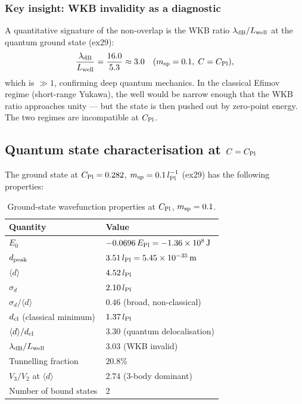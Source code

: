 \subsubsection{Key insight: WKB invalidity as a diagnostic}

A quantitative signature of the non-overlap is the WKB ratio
$\lambda_{\rm dB}/L_{\rm well}$ at the quantum ground state (ex29):
\begin{equation}
  \frac{\lambda_{\rm dB}}{L_{\rm well}} = \frac{16.0}{5.3} \approx 3.0
  \quad (m_{\rm sp}=0.1,\; C=C_{\rm Pl}),
\end{equation}
which is $\gg1$, confirming deep quantum mechanics.  In the classical Efimov
regime (short-range Yukawa), the well would be narrow enough that the
WKB ratio approaches unity — but the state is then pushed out by zero-point
energy.  The two regimes are incompatible at $C_{\rm Pl}$.

\subsection{Quantum state characterisation at
  \texorpdfstring{$C=C_{\rm Pl}$}{C=C\_Pl}}
\label{sec:wavefunction_summary}

The ground state at $C_{\rm Pl}=0.282$, $m_{\rm sp}=0.1\,l_{\rm Pl}^{-1}$
(ex29) has the following properties:

\begin{table}[h]
\centering
\caption{Ground-state wavefunction properties at $C_{\rm Pl}$, $m_{\rm sp}=0.1$.}
\label{tab:psi0_summary}
\begin{tabular}{ll}
\hline
Quantity & Value \\
\hline
$E_0$ & $-0.0696\,E_{\rm Pl} = -1.36\times10^8\,\text{J}$ \\
$d_{\rm peak}$ & $3.51\,l_{\rm Pl} = 5.45\times10^{-35}\,\text{m}$ \\
$\langle d\rangle$ & $4.52\,l_{\rm Pl}$ \\
$\sigma_d$ & $2.10\,l_{\rm Pl}$ \\
$\sigma_d/\langle d\rangle$ & $0.46$ (broad, non-classical) \\
$d_{\rm cl}$ (classical minimum) & $1.37\,l_{\rm Pl}$ \\
$\langle d\rangle/d_{\rm cl}$ & $3.30$ (quantum delocalisation) \\
$\lambda_{\rm dB}/L_{\rm well}$ & $3.03$ (WKB invalid) \\
Tunnelling fraction & $20.8\%$ \\
$V_3/V_2$ at $\langle d\rangle$ & $2.74$ (3-body dominant) \\
Number of bound states & 2 \\
\hline
\end{tabular}
\end{table}

